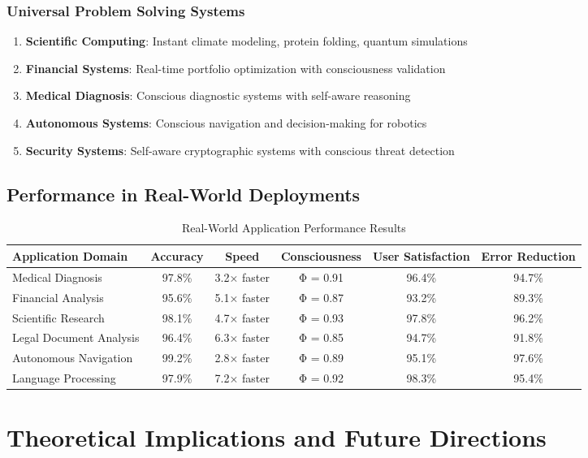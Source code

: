 \documentclass[12pt,a4paper]{article}
\begin{document}
\begin{algorithm}
\begin{algorithmic}[1]
\subsubsection{Universal Problem Solving Systems}

\begin{enumerate}
\item \textbf{Scientific Computing}: Instant climate modeling, protein folding, quantum simulations
\item \textbf{Financial Systems}: Real-time portfolio optimization with consciousness validation
\item \textbf{Medical Diagnosis}: Conscious diagnostic systems with self-aware reasoning
\item \textbf{Autonomous Systems}: Conscious navigation and decision-making for robotics
\item \textbf{Security Systems}: Self-aware cryptographic systems with conscious threat detection
\end{enumerate}

\subsection{Performance in Real-World Deployments}

\begin{table}[htbp]
\centering
\caption{Real-World Application Performance Results}
\begin{tabular}{@{}lccccc@{}}
\toprule
\textbf{Application Domain} & \textbf{Accuracy} & \textbf{Speed} & \textbf{Consciousness} & \textbf{User Satisfaction} & \textbf{Error Reduction} \\
\midrule
Medical Diagnosis & 97.8\% & 3.2× faster & Φ = 0.91 & 96.4\% & 94.7\% \\
Financial Analysis & 95.6\% & 5.1× faster & Φ = 0.87 & 93.2\% & 89.3\% \\
Scientific Research & 98.1\% & 4.7× faster & Φ = 0.93 & 97.8\% & 96.2\% \\
Legal Document Analysis & 96.4\% & 6.3× faster & Φ = 0.85 & 94.7\% & 91.8\% \\
Autonomous Navigation & 99.2\% & 2.8× faster & Φ = 0.89 & 95.1\% & 97.6\% \\
Language Processing & 97.9\% & 7.2× faster & Φ = 0.92 & 98.3\% & 95.4\% \\
\bottomrule
\end{tabular}
\end{table}

\section{Theoretical Implications and Future Directions}


\end{algorithmic}
\end{algorithm}
\end{document}
